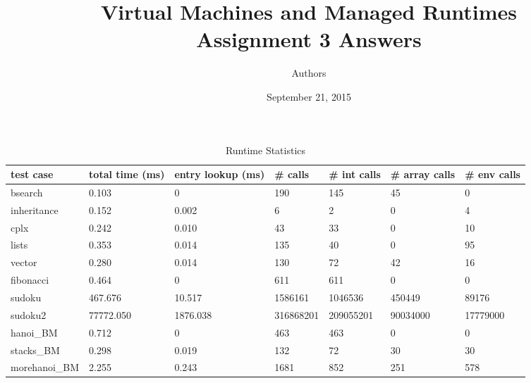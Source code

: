 \documentclass[notitlepage]{report}
\title{\vspace{-0.5in}Virtual Machines and Managed Runtimes \\ Assignment 3 Answers}
\date{\vspace{-0.5in}September 21, 2015}
\author{\vspace{-0.5in}Authors\vspace{-0.5in}}
\begin{document}
\maketitle

\begin{table}[!htp]
\centering
\caption{Runtime Statistics}
\label{statistics}
{\footnotesize
\begin{tabular}{lllllll}
\toprule
test case & total time (ms)    & entry lookup (ms) & \# calls & \# int calls & \# array calls & \# env calls \\
\midrule
bsearch       & 0.103      & 0                     & 190          & 145              & 45                 & 0                \\
inheritance   & 0.152      & 0.002                 & 6            & 2                & 0                  & 4                \\
cplx          & 0.242      & 0.010                 & 43           & 33               & 0                  & 10               \\
lists         & 0.353      & 0.014                 & 135          & 40               & 0                  & 95               \\
vector        & 0.280      & 0.014                 & 130          & 72               & 42                 & 16               \\
fibonacci     & 0.464      & 0                     & 611          & 611              & 0                  & 0                \\
sudoku        & 467.676    & 10.517                & 1586161      & 1046536          & 450449             & 89176            \\
sudoku2       & 77772.050  & 1876.038              & 316868201    & 209055201        & 90034000           & 17779000         \\
hanoi\_BM     & 0.712      & 0                     & 463          & 463              & 0                  & 0                \\
stacks\_BM    & 0.298      & 0.019                 & 132          & 72               & 30                 & 30               \\
morehanoi\_BM & 2.255      & 0.243                 & 1681         & 852              & 251                & 578              \\
\bottomrule
\end{tabular}
}
\end{table}
\end{document}
